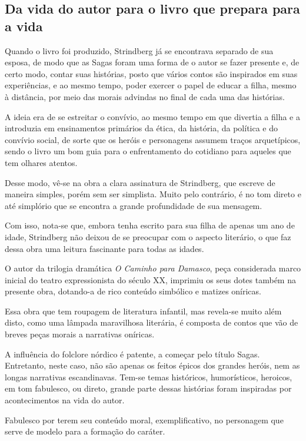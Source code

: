 \documentclass{extarticle}
\begin{document}
\subsection{Da vida do autor para o livro que prepara para a vida}

Quando o livro foi produzido, Strindberg já se encontrava separado de
sua esposa, de modo que as Sagas foram uma forma de o autor se fazer
presente e, de certo modo, contar suas histórias, posto que vários
contos são inspirados em suas experiências, e ao mesmo tempo, poder
exercer o papel de educar a filha, mesmo à distância, por meio das
morais advindas no final de cada uma das histórias.

A ideia era de se estreitar o convívio, ao mesmo tempo em que divertia a
filha e a introduzia em ensinamentos primários da ética, da história, da
política e do convívio social, de sorte que os heróis e personagens
assumem traços arquetípicos, sendo o livro um bom guia para o
enfrentamento do cotidiano para aqueles que tem olhares atentos.

Desse modo, vê-se na obra a clara assinatura de Strindberg, que escreve
de maneira simples, porém sem ser simplista. Muito pelo contrário, é no
tom direto e até simplório que se encontra a grande profundidade de sua
mensagem.

Com isso, nota-se que, embora tenha escrito para sua filha de apenas um
ano de idade, Strindberg não deixou de se preocupar com o aspecto
literário, o que faz dessa obra uma leitura fascinante para todas as
idades.

O autor da trilogia dramática \emph{O Caminho para Damasco}, peça
considerada marco inicial do teatro expressionista do século XX,
imprimiu os seus dotes também na presente obra, dotando-a de rico
conteúdo simbólico e matizes oníricas.

Essa obra que tem roupagem de literatura infantil, mas revela-se muito
além disto, como uma lâmpada maravilhosa literária, é composta de contos
que vão de breves peças morais a narrativas oníricas.

A influência do folclore nórdico é patente, a começar pelo título Sagas.
Entretanto, neste caso, não são apenas os feitos épicos dos grandes
heróis, nem as longas narrativas escandinavas. Tem-se temas históricos,
humorísticos, heroicos, em tom fabulesco, ou direto, grande parte dessas
histórias foram inspiradas por acontecimentos na vida do autor.

Fabulesco por terem seu conteúdo moral, exemplificativo, no personagem
que serve de modelo para a formação do caráter.
\end{document}
